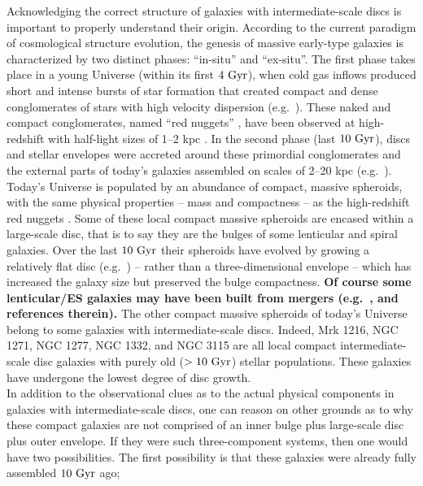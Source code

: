 \documentclass[useAMS,usenatbib,article]{mnras}
\begin{document}
Acknowledging the correct structure of galaxies with intermediate-scale discs is important to properly understand their origin. 
According to the current paradigm of cosmological structure evolution, 
the genesis of massive early-type galaxies is characterized by two distinct phases: ``in-situ'' and ``ex-situ''. 
The first phase takes place in a young Universe (within its first $4~\rm Gyr$), 
when cold gas inflows produced short and intense bursts of star formation 
that created compact and dense conglomerates of stars with high velocity dispersion (e.g.~\citealt{prieto2013}). 
These naked and compact conglomerates, named ``red nuggets'' \citep{damjanov2009}, 
have been observed at high-redshift with half-light sizes of 1--2 kpc \citep{daddi2005,trujillo2006,vandokkum2008}.
In the second phase (last $10~\rm Gyr$), discs and stellar envelopes 
were accreted around these primordial conglomerates and the external parts of today's galaxies assembled on scales of 2--20 kpc 
(e.g.~\citealt{driver2013}). \\
Today's Universe is populated by an abundance of compact, massive spheroids, 
with the same physical properties -- mass and compactness -- as the high-redshift red nuggets \citep{GDS2015}. 
Some of these local compact massive spheroids are encased within a large-scale disc, 
that is to say they are the bulges of some lenticular and spiral galaxies.  
Over the last $10~\rm Gyr$ their spheroids have evolved by growing a relatively flat disc (e.g.~\citealt{pichon2011,danovich2012,stewart2013})
-- rather than a three-dimensional envelope -- 
which has increased the galaxy size but preserved the bulge compactness. 
{\bf Of course some lenticular/ES galaxies may have been built from mergers (e.g.~\citealt{querejeta2015}, and references therein). }
The other compact massive spheroids of today's Universe belong to some galaxies with intermediate-scale discs. 
Indeed, Mrk 1216, NGC 1271, NGC 1277, NGC 1332, and NGC 3115 are all local compact intermediate-scale disc galaxies 
with purely old ($>10~\rm Gyr$) stellar populations. 
These galaxies have undergone the lowest degree of disc growth. \\
In addition to the observational clues as to the actual physical components in galaxies with intermediate-scale discs, 
one can reason on other grounds as to why these compact galaxies are not comprised of an inner bulge 
plus large-scale disc plus outer envelope. 
If they were such three-component systems, then one would have two possibilities. 
The first possibility is that these galaxies were already fully assembled $10~\rm Gyr$ ago; 
\end{document}

